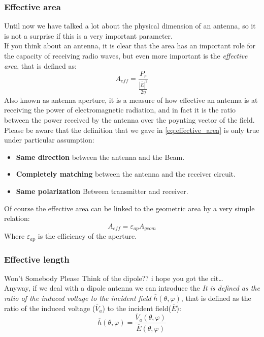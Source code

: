\subsubsection*{Effective area}
Until now we have talked a lot about the physical dimension of an antenna, so it is not a surprise if this is a very important parameter.\\
If you think about an antenna, it is clear that the area has an important role for the capacity of receiving radio waves, but even more important is the \emph{effective area}, that is defined as:
\begin{equation}\label{eq:effective_area}
    A_{eff}=\frac{P_r}{\frac{|\overline{E}|^2}{2\eta}}
\end{equation}
Also known as antenna aperture, it is a measure of how effective an antenna is at receiving the power of electromagnetic radiation, and in fact it is the ratio between the power received by the antenna over the poynting vector of the field.\\
Please be aware that the definition that we gave in \cref{eq:effective_area} is only true under particular assumption:
\begin{itemize}
    \item \textbf{Same direction} between the antenna and the Beam.
    \item \textbf{Completely matching} between the antenna and the receiver circuit.
    \item \textbf{Same polarization} Between transmitter and receiver.
\end{itemize}
Of course the effective area can be linked to the geometric area by a very simple relation:
\begin{equation}
    A_{eff}=\varepsilon_{ap} A_{geom}
\end{equation}
Where $\varepsilon_{ap}$ is the efficiency of the aperture.
\subsubsection*{Effective length}
Won't Somebody Please Think of the dipole?? \footnotesize{i hope you got the cit\dots} \\
Anyway, if we deal with a dipole antenna we can introduce the \emph{It is defined as the ratio of the induced voltage to the incident field} $\overline{h}(\theta,\varphi)$, that is defined as the ratio of the induced voltage ($\overline{V}_a$) to the incident field($\overline{E}$):
\begin{equation}
    \overline{h}(\theta,\varphi)=\frac{\overline{V}_a(\theta,\varphi)}{\overline{E}(\theta,\varphi)}
\end{equation}

